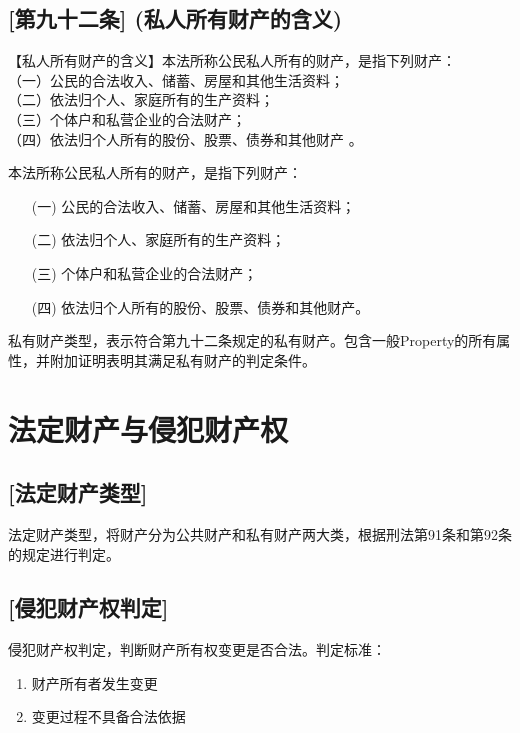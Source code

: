 \subsection{[第九十二条] (私人所有财产的含义)}

【私人所有财产的含义】本法所称公民私人所有的财产，是指下列财产：\\
（一）公民的合法收入、储蓄、房屋和其他生活资料；\\
（二）依法归个人、家庭所有的生产资料；\\
（三）个体户和私营企业的合法财产；\\
（四）依法归个人所有的股份、股票、债券和其他财产 。

\begin{definition}\label{isPrivateProperty}
\leanok
{}
本法所称公民私人所有的财产，是指下列财产：
\begin{enumerate}
\item[(一)] 公民的合法收入、储蓄、房屋和其他生活资料；
\item[(二)] 依法归个人、家庭所有的生产资料；
\item[(三)] 个体户和私营企业的合法财产；
\item[(四)] 依法归个人所有的股份、股票、债券和其他财产。
\end{enumerate}
\end{definition}

\begin{definition}\label{PrivateProperty}
\leanok
{}
私有财产类型，表示符合第九十二条规定的私有财产。包含一般Property的所有属性，并附加证明表明其满足私有财产的判定条件。
\end{definition}

\section{法定财产与侵犯财产权}

\subsection{[法定财产类型]}

\begin{definition}\label{LegalProperty}
\leanok
{}
法定财产类型，将财产分为公共财产和私有财产两大类，根据刑法第91条和第92条的规定进行判定。
\end{definition}

\subsection{[侵犯财产权判定]}

\begin{definition}\label{isPropertyRightsViolation}
\leanok
{}
侵犯财产权判定，判断财产所有权变更是否合法。判定标准：
\begin{enumerate}
\item 财产所有者发生变更
\item 变更过程不具备合法依据
\end{enumerate}
\end{definition}
